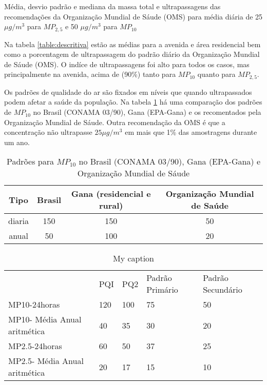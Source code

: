 Média, desvio padrão e mediana da massa total e ultrapassagens das 
           recomendações da Organização Mundial de Sáude (OMS) para média diária de 
           25 $\mu g/m^3$ para $MP_{2,5}$ e 50 $\mu g/m^3$ para $MP_{10}$


Na tabela \ref{table:descritiva} estão as médias para a avenida e área residencial
bem como a porcentagem de ultrapassagem do padrão diário da 
Organização Mundial de Sáude (OMS).
O indíce de ultrapassagens foi alto para todos os casos, mas principalmente na avenida,
acima de (90\%) tanto para $MP_{10}$ quanto para $MP_{2,5}$.

Os padrões de qualidade do ar são fixados em níveis que quando ultrapassados 
podem afetar a saúde da população. 
Na tabela \ref{table:pm10standards} há uma comparação dos padrões de $MP_{10}$ 
no Brasil (CONAMA 03/90), Gana (EPA-Gana) e os recomentados pela Organização
Mundial de Sáude.
Outra recomendação da OMS é que a concentração não ultrapasse $25 \mu g/m^3$ 
em mais que 1\% das amostragens durante um ano. 

\begin{table}[H]
  \centering
  \begin{scriptsize}
      \begin{tabular}{cccc}
     \hline
   Tipo & Brasil & Gana (residencial e rural) & Organização Mundial de Saúde \\
     \hline
   diaria & 150 & 150 &  50 \\
     anual &  50 & 100 &  20 \\
      \hline
  \end{tabular}
  \end{scriptsize}
  \caption{Padrões para $MP_{10}$ no Brasil (CONAMA 03/90), Gana (EPA-Gana) e 
          Organização Mundial de Sáude \label{table:pm10standards}}
\end{table}

\begin{table}[]
\centering
\caption{My caption}
\label{my-label}
\begin{tabular}{lllll}
                              & PQI & PQ2 & Padrão Primário & Padrão Secundário \\
MP10-24horas                  & 120 & 100 & 75              & 50                \\
MP10- Média Anual aritmética  & 40  & 35  & 30              & 20                \\
MP2.5-24horas                 & 60  & 50  & 37              & 25                \\
MP2.5- Média Anual aritmética & 20  & 17  & 15              & 10               
\end{tabular}
\end{table}

